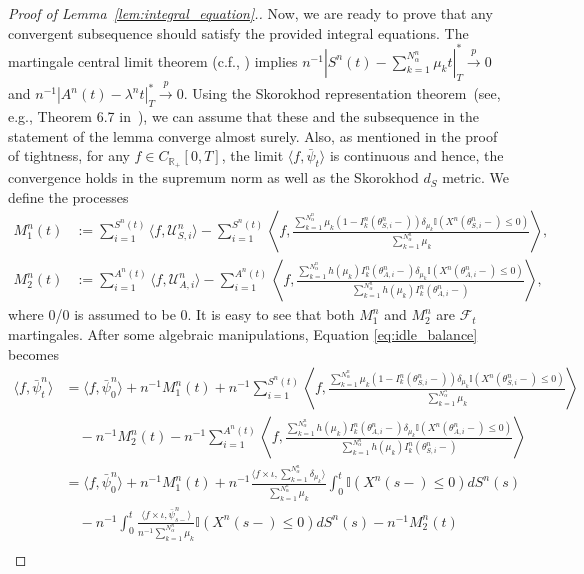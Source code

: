\documentclass[a4paper,11pt,twoside]{article}
\numberwithin{equation}{section}
\numberwithin{figure}{section}
\theoremstyle{plain}
\newcommand{\cF}{\mathcal{F}}
\newcommand{\cU}{\mathcal{U}}
\newcommand{\II}{\mathbb{I}}
\newcommand{\RR}{\mathbb{R}}
\newcommand{\1}{\mathbbm{1}}
\newcommand{\toP}{\stackrel{p}{\rightarrow}}
\begin{document}
\begin{proof}[Proof of Lemma~\ref{lem:integral_equation}.]
Now, we are ready to prove that any convergent subsequence should satisfy the provided integral equations. 
The martingale central limit theorem (c.f., \cite{ptw07}) implies $n^{-1}|S^n(t)-\sum_{k=1}^{N^n_\alpha}\mu_kt|_T^*\toP 0$ and $n^{-1}|A^n(t)-\lambda^nt|_T^*\toP 0$. Using the Skorokhod representation theorem~(see, e.g., Theorem 6.7 in~\cite{bil99}), we can assume that these and the subsequence in the statement of the lemma converge almost surely. Also, as mentioned in the proof of tightness, for any $f\in C_{\RR_+}[0,T]$, the limit $\langle f, \bar{\psi}_t\rangle$ is continuous and hence, the convergence holds in the supremum norm as well as the Skorokhod $d_S$ metric. We define the processes
\begin{align*}
    M_1^n(t) &:= \sum_{i=1}^{S^n(t)}\langle f, \cU_{S,i}^n\rangle - \sum_{i=1}^{S^n(t)}\left\langle f, \frac{\sum_{k=1}^{N_\alpha^n}\mu_k(1-I_k^n(\theta_{S,i}^n-))\delta_{\mu_k}\II(X^n(\theta_{S,i}^n-)\leq 0)}{\sum_{k=1}^{N_\alpha^n}\mu_k}\right\rangle,
    \\
    M_2^n(t)&:=\sum_{i=1}^{A^n(t)}\langle f, \cU_{A,i}^n \rangle - \sum_{i=1}^{A^n(t)}\left\langle f, \frac{\sum_{k=1}^{N_\alpha^n} h(\mu_k)I_k^n(\theta_{A,i}^n-)\delta_{\mu_k}\II(X^n(\theta_{A,i}^n-)\leq 0)}{\sum_{k=1}^{N_\alpha^n}h(\mu_k)I_k^n(\theta_{A,i}^n-)}\right\rangle, \end{align*}
where 0/0 is assumed to be 0. It is easy to see that both $M_1^n$ and $M_2^n$ are $\cF_t$ martingales. After some algebraic manipulations, Equation \eqref{eq:idle_balance} becomes 
\begin{align}
    \nonumber \langle f, \bar{\psi}^{n}_t\rangle &= \langle f, \bar{\psi}_0^{n}\rangle + n^{-1}M_1^n(t) + n^{-1}\sum_{i=1}^{S^n(t)}\left\langle f, \frac{\sum_{k=1}^{N_\alpha^n}\mu_k(1-I_k^n(\theta_{S,i}^n-))\delta_{\mu_k}\II(X^n(\theta_{S,i}^n-)\leq 0)}{\sum_{k=1}^{N_\alpha^n}\mu_k}\right\rangle\\
    \nonumber&\quad - n^{-1}M_2^n(t) - n^{-1}\sum_{i=1}^{A^n(t)}\left\langle f, \frac{\sum_{k=1}^{N_\alpha^n} h(\mu_k)I_k^n(\theta_{A,i}^n-)\delta_{\mu_k}\II(X^n(\theta_{A,i}^n-)\leq 0)}{\sum_{k=1}^{N_\alpha^n}h(\mu_k)I_k^n(\theta_{S,i}^n-)}\right\rangle \\
    \nonumber &=\langle f, \bar{\psi}_0^{n}\rangle + n^{-1}M_1^n(t) + n^{-1}\frac{\langle f\times \iota, \sum_{k=1}^{N^n_\alpha}\delta_{\mu_k} \rangle}{\sum_{k=1}^{N^n_\alpha}\mu_k}\int_0^t\II(X^n(s-)\leq 0)dS^n(s) \\
  \nonumber &\quad- n^{-1}\int_0^t\frac{\langle f\times \iota, \bar{\psi}_{s-}^n\rangle}{n^{-1}\sum_{k=1}^{N^n_\alpha}\mu_k}\II(X^n(s-)\leq 0)dS^n(s) - n^{-1}M_2^n(t) \\

\end{align}
\end{proof}
\end{document}
